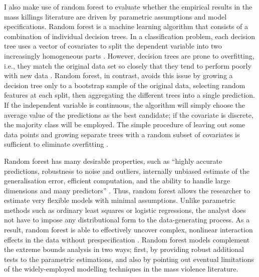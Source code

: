 I also make use of random forest \citep{breiman2001random} to evaluate whether the empirical results in the mass killings literature are driven by parametric assumptions and model specifications. Random forest is a machine learning algorithm that consists of a combination of individual decision trees. In a classification problem, each decision tree uses a vector of covariates to split the dependent variable into two increasingly homogeneous parts \citep{breiman2001statistical}. However, decision trees are prone to overfitting, i.e., they match the original data set so closely that they tend to perform poorly with new data \citep{dietterich1995comparison,ho1998random}. Random forest, in contrast, avoids this issue by growing a decision tree only to a bootstrap sample of the original data, selecting random features at each split, then aggregating the different trees into a single prediction. If the independent variable is continuous, the algorithm will simply choose the average value of the predictions as the best candidate; if the covariate is discrete, the majority class will be employed. The simple procedure of leaving out some data points and growing separate trees with a random subset of covariates is sufficient to eliminate overfitting \citep[9-10]{jones2015exploratory}.
	
Random forest has many desirable properties, such as ``highly accurate predictions, robustness to noise and outliers, internally unbiased estimate of the generalisation error, efficient computation, and the ability to handle large dimensions and many predictors'' \citep[7]{muchlinski2015comparing}. Thus, random forest allows the researcher to estimate very flexible models with minimal assumptions. Unlike parametric methods such as ordinary least squares or logistic regressions, the analyst does not have to impose any distributional form to the data-generating process. As a result, random forest is able to effectively uncover complex, nonlinear interaction effects in the data without prespecification \citep{jones2015exploratory,jones2018there}. Random forest models complement the extreme bounds analysis in two ways; first, by providing robust additional tests to the parametric estimations, and also by pointing out eventual limitations of the widely-employed modelling techniques in the mass violence literature. 
	
